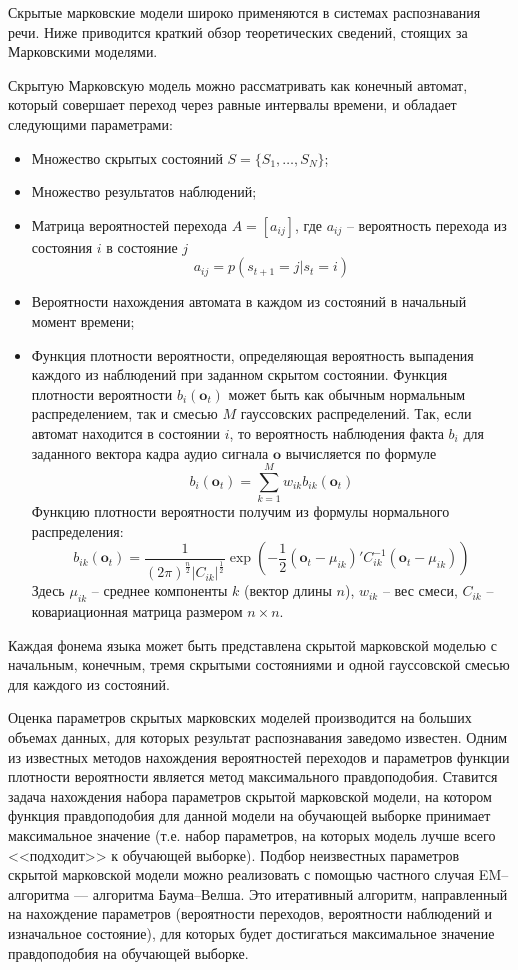 Скрытые марковские модели широко применяются в системах распознавания речи. Ниже приводится краткий обзор теоретических сведений, стоящих за Марковскими моделями. 

Скрытую Марковскую модель можно рассматривать как конечный автомат, который совершает переход через равные интервалы времени, и обладает следующими параметрами:
\begin{itemize}
	\item Множество скрытых состояний $S = \{S_1, \dots, S_N\}$;
	\item Множество результатов наблюдений;
	\item Матрица вероятностей перехода $A = [a_{ij}]$, где $a_{ij}$ -- вероятность перехода из состояния $i$ в состояние $j$
	$$ a_{ij} = p(s_{t+1}=j|s_t=i)$$
	\item Вероятности нахождения автомата в каждом из состояний в начальный момент времени;
	\item Функция плотности вероятности, определяющая вероятность выпадения каждого из наблюдений при заданном скрытом состоянии. Функция плотности вероятности $b_i(\textbf{o}_t)$ может быть как обычным нормальным распределением, так и смесью $M$ гауссовских распределений. Так, если автомат находится в состоянии $i$, то вероятность наблюдения факта $b_i$ для заданного вектора кадра аудио сигнала $\textbf{o}$ вычисляется по формуле
	$$b_i(\textbf{o}_t) = \sum_{k=1}^{M}w_{ik}b_{ik}(\textbf{o}_t)$$
	Функцию плотности вероятности получим из формулы нормального распределения:
	$$b_{ik}(\textbf{o}_t) = \frac{1}{(2\pi)^\frac{n}{2} \left| C_{ik} \right|^\frac{1}{2}} \exp\left(-\frac{1}{2}\left(\textbf{o}_t - \mu_{ik}\right)' C^{-1}_{ik} \left(\textbf{o}_t - \mu_{ik}\right)\right)$$
	Здесь $\mu_{ik}$ -- среднее компоненты $k$ (вектор длины $n$), $w_{ik}$ -- вес смеси, $C_{ik}$ -- ковариационная матрица размером $n \times n$.
\end{itemize}

Каждая фонема языка может быть представлена скрытой марковской моделью с начальным, конечным, тремя скрытыми состояниями и одной гауссовской смесью для каждого из состояний.

Оценка параметров скрытых марковских моделей производится на больших объемах данных, для которых результат распознавания заведомо известен. Одним из известных методов нахождения вероятностей переходов и параметров функции плотности вероятности является метод максимального правдоподобия\cite[с.~342]{rabiner1993fundamentals}. Ставится задача нахождения набора параметров скрытой марковской модели, на котором функция правдоподобия для данной модели на обучающей выборке принимает максимальное значение (т.е. набор параметров, на которых модель лучше всего <<подходит>> к обучающей выборке). Подбор неизвестных параметров скрытой марковской модели можно реализовать с помощью частного случая EM--алгоритма\cite{dempster1977maximum} --- алгоритма Баума--Велша. Это итеративный алгоритм, направленный на нахождение параметров (вероятности переходов, вероятности наблюдений и изначальное состояние), для которых будет достигаться максимальное значение правдоподобия на обучающей выборке.

